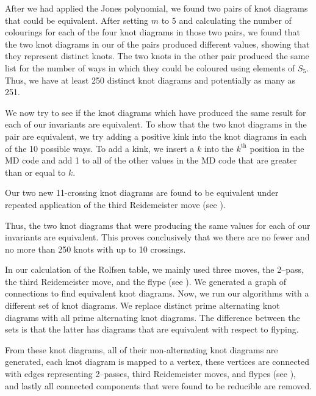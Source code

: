 \begin{paper}
After we had applied the Jones polynomial, we found two pairs of knot diagrams
that could be equivalent.
After setting $m$ to 5 and calculating the number of colourings for each of the
four knot diagrams in those two pairs, we found that the two knot diagrams in
our of the pairs produced different values, showing that they represent distinct
knots.
The two knots in the other pair produced the same list for the number of ways in
which they could be coloured using elements of $S_5$.
Thus, we have at least 250 distinct knot diagrams and potentially as many as
251.


We now try to see if the knot diagrams which have produced the same result for
each of our invariants are equivalent.
To show that the two knot diagrams in the pair are equivalent, we try adding a
positive kink into the knot diagrams in each of the 10 possible ways.
To add a kink, we insert a $k$ into the $k^\text{th}$ position in the MD code
and add 1 to all of the other values in the MD code that are greater than or
equal to $k$.


Our two new 11-crossing knot diagrams are found to be equivalent under repeated
application of the third Reidemeister move (see \figMoves).


Thus, the two knot diagrams that were producing the same values for each of our
invariants are equivalent.
This proves conclusively that we there are no fewer and no more than 250 knots
with up to 10 crossings.



In our calculation of the Rolfsen table, we mainly used three moves, the
2--pass, the third Reidemeister move, and the flype (see \figMoves).
We generated a graph of connections to find equivalent knot diagrams.
Now, we run our algorithms with a different set of knot diagrams.
We replace distinct prime alternating knot diagrams with all prime alternating
knot diagrams.
The difference between the sets is that the latter has diagrams that are
equivalent with respect to flyping.

From these knot diagrams, all of their non-alternating knot diagrams are
generated, each knot diagram is mapped to a vertex, these vertices are connected
with edges representing 2--passes, third Reidemeister moves, and flypes
(see \figMoves), and lastly all connected components that were found to be
reducible are removed.


\end{paper}
